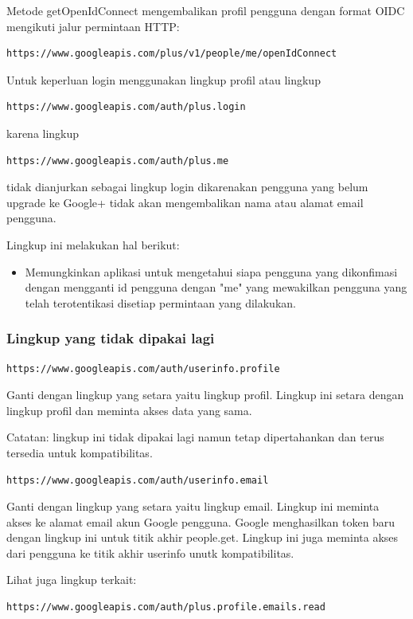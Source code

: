 Metode getOpenIdConnect mengembalikan profil pengguna dengan format OIDC mengikuti jalur permintaan HTTP:
\begin{lstlisting}
https://www.googleapis.com/plus/v1/people/me/openIdConnect
\end{lstlisting}

Untuk keperluan login menggunakan lingkup profil atau lingkup
\begin{lstlisting}
https://www.googleapis.com/auth/plus.login
\end{lstlisting}
karena lingkup
\begin{lstlisting}
https://www.googleapis.com/auth/plus.me
\end{lstlisting}
tidak dianjurkan sebagai lingkup login dikarenakan pengguna yang belum upgrade ke Google+ tidak akan mengembalikan nama atau alamat email pengguna.

Lingkup ini melakukan hal berikut:
\begin{itemize}
\item
Memungkinkan aplikasi untuk mengetahui siapa pengguna yang dikonfimasi dengan mengganti id pengguna dengan "me" yang mewakilkan pengguna yang telah terotentikasi disetiap permintaan yang dilakukan.
\end{itemize}

\subsubsection{Lingkup yang tidak dipakai lagi}
\begin{lstlisting}
https://www.googleapis.com/auth/userinfo.profile
\end{lstlisting}
Ganti dengan lingkup yang setara yaitu lingkup profil. Lingkup ini setara dengan lingkup profil dan meminta akses data yang sama.

Catatan: lingkup ini tidak dipakai lagi namun tetap dipertahankan dan terus tersedia untuk kompatibilitas.

\begin{lstlisting}
https://www.googleapis.com/auth/userinfo.email
\end{lstlisting}
Ganti dengan lingkup yang setara yaitu lingkup email. Lingkup ini meminta akses ke alamat email akun Google pengguna.
Google menghasilkan token baru dengan lingkup ini untuk titik akhir people.get. Lingkup ini juga meminta akses dari pengguna ke titik akhir userinfo unutk kompatibilitas.

Lihat juga lingkup terkait:
\begin{lstlisting}
https://www.googleapis.com/auth/plus.profile.emails.read
\end{lstlisting}

